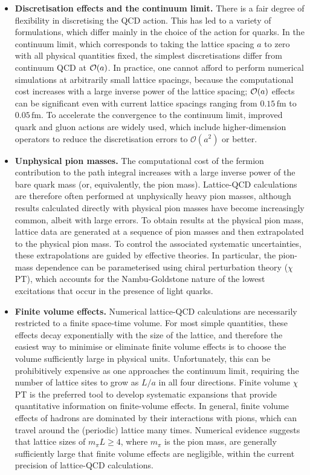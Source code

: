 \begin{itemize}

\item {\bfseries Discretisation effects and the continuum limit.} There is 
a fair degree of flexibility in discretising the QCD action. This has
led to a variety of formulations, which differ mainly in the choice of
the action for quarks.
%
In the continuum limit, which corresponds to taking
the lattice spacing $a$ to zero with all physical quantities fixed,
the simplest discretisations differ from continuum QCD at ${\cal
O}(a)$.
%
In practice, one cannot afford to perform numerical simulations at arbitrarily 
small lattice spacings, because the computational cost increases with a large 
inverse power of the lattice spacing; ${\cal O}(a)$ effects can be 
significant even with current lattice spacings ranging from 
$0.15 \,\mbox{fm}$ to $0.05 \,\mbox{fm}$.
%
To accelerate the convergence to the continuum
limit, improved quark and gluon actions are widely used, which include
higher-dimension operators to reduce the discretisation errors to
$\mathcal{O}(a^2)$ or better.

\item {\bfseries Unphysical pion masses.} 
The computational cost of the fermion contribution to the path
integral increases with a large inverse power of the bare quark mass
(or, equivalently, the pion mass).
%
Lattice-QCD calculations are therefore
often performed at unphysically heavy pion masses, although results calculated
directly with physical pion masses have become increasingly common, albeit with large
 errors.
%
To obtain results at the physical pion mass, lattice data are
generated at a sequence of pion masses and then extrapolated to the
physical pion mass.
%
To control the associated systematic
uncertainties, these extrapolations are guided by effective
theories.
%
In particular, the pion-mass dependence can be parameterised
using chiral perturbation theory ($\chi$PT), which accounts for the
Nambu-Goldstone nature of the lowest excitations that occur in the
presence of light quarks. 

\item {\bfseries Finite volume effects.} 
Numerical lattice-QCD calculations are necessarily restricted to a finite 
space-time volume.
%
For most simple quantities, these effects decay exponentially
with the size of the lattice, and therefore the easiest way to
minimise or eliminate finite volume effects is to choose the volume
sufficiently large in physical units.
%
Unfortunately, this can be prohibitively expensive as one approaches the 
continuum limit, requiring the number of lattice sites to grow as $L/a$ 
in all four directions. Finite volume $\chi$PT is the preferred
tool to develop systematic expansions that provide quantitative
information on finite-volume effects.
%
In general, finite volume
effects of hadrons are dominated by their interactions with pions,
which can travel around the (periodic) lattice many times.
%
Numerical evidence suggests that lattice sizes of $m_\pi L \geq 4$, where
$m_\pi$ is the pion mass, are generally sufficiently large that finite
volume effects are negligible, within the current precision of lattice-QCD
calculations.


\end{itemize}

